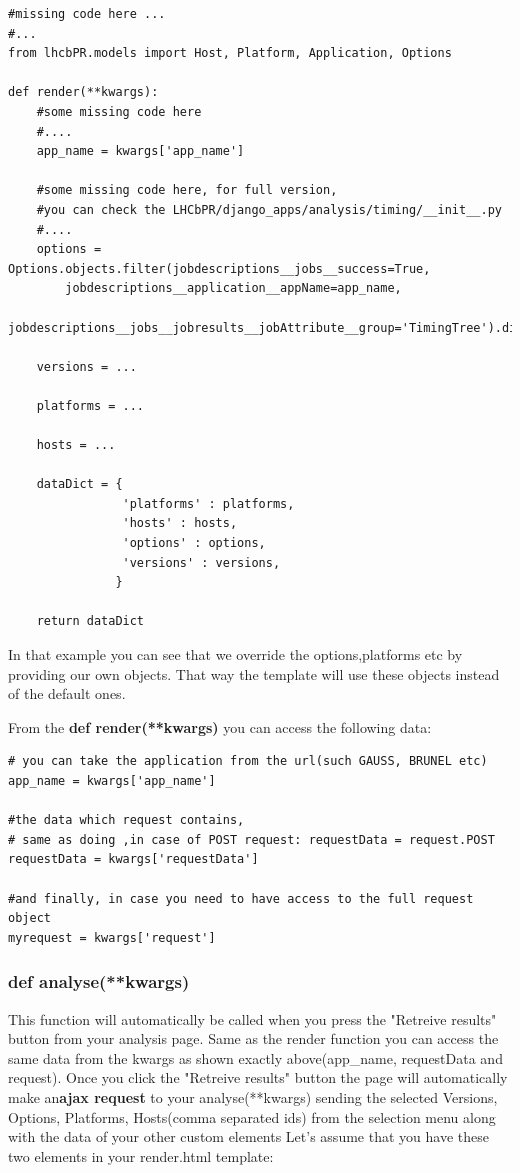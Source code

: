 \documentclass{lhcbnote}
\begin{document}
\begin{verbatim}
#missing code here ...
#...
from lhcbPR.models import Host, Platform, Application, Options

def render(**kwargs):
    #some missing code here
    #....
    app_name = kwargs['app_name']

    #some missing code here, for full version,
    #you can check the LHCbPR/django_apps/analysis/timing/__init__.py
    #....
    options = Options.objects.filter(jobdescriptions__jobs__success=True,
        jobdescriptions__application__appName=app_name,
        jobdescriptions__jobs__jobresults__jobAttribute__group='TimingTree').distinct().order_by('description')
        
    versions = ...
    
    platforms = ...
     
    hosts = ...
    
    dataDict = {
                'platforms' : platforms,
                'hosts' : hosts,
                'options' : options,
                'versions' : versions,
               }
      
    return dataDict
\end{verbatim} 

In that example you can see that we override the options,platforms etc by providing our own objects. That way
the template will use these objects instead of the default ones. 

\vspace{2 mm}
From the {\bf def render(**kwargs)} you can access the following data:

\begin{verbatim}
# you can take the application from the url(such GAUSS, BRUNEL etc)
app_name = kwargs['app_name']

#the data which request contains,
# same as doing ,in case of POST request: requestData = request.POST
requestData = kwargs['requestData']

#and finally, in case you need to have access to the full request object
myrequest = kwargs['request']
\end{verbatim}

\subsubsection{def analyse(**kwargs)}

This function will automatically  be called when you press the "Retreive results" button from your analysis page.
Same as the render function you can access the same data from the kwargs as shown exactly above(app\_name, requestData and request). 
Once you click the "Retreive results" button the page will automatically make an{\bf ajax request} to your analyse(**kwargs) sending the 
selected Versions, Options, Platforms, Hosts(comma separated ids) from the selection menu along with the data of your other custom elements
Let's assume that you have these two elements in your render.html template:
\end{document}

